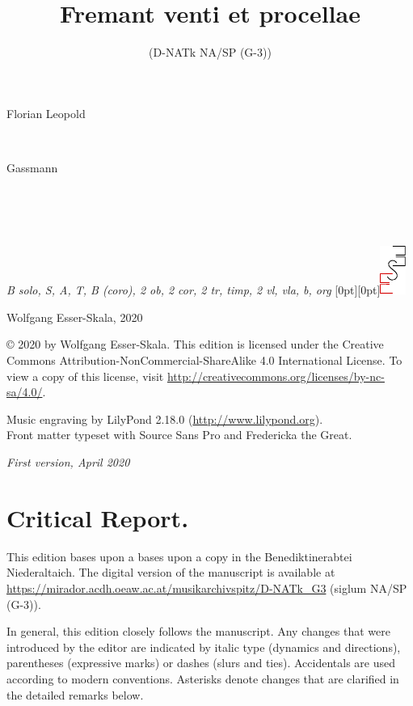 \documentclass[parskip=full]{scrreprt}
\makeatletter
\DeclareRobustCommand{\sbseries}{\fontseries{sb}\selectfont}
\newcommand\fancytitlehead{
	\headingfont%
	\fontsize{80}{80}\selectfont\textcolor{black!80}{\@lastname.}\\[15pt]%
	\fontsize{60}{60}\selectfont\@ifundefined{@shorttitle}{\@title}{\@shorttitle}.%
}
\def\firstname#1{\def\@firstname{#1}}
\def\lastname#1{\def\@lastname{#1}}
\def\shorttitle#1{\def\@shorttitle{#1}}
\def\instrumentation#1{\def\@instrumentation{#1}}
\def\maketitle{%
\begin{titlepage}%
	\Large%
	{\@titlehead}%
	\vfill%
	{\strut\@firstname}\\%
	{\sbseries\color{oldred}\strut\@lastname}\\%
	{\strut\@namesuffix}%
	\vfill%
	{\sbseries\@title}\\%
	{\@subtitle}\\[\baselineskip]%
	{\itshape\@instrumentation}%
	\vfill%
	{\itshape\@parts}\hspace*{\fill}\raisebox{0pt}[0pt][0pt]{\includegraphics{ees_logo}}%
\end{titlepage}%
}
\newif\ifprintreport\printreportfalse
\makeatother
\begin{document}
\titlehead{\fancytitlehead}
\firstname{Florian Leopold}
\lastname{Gassmann}
\title{Fremant venti et procellae}
\shorttitle{Fremant venti}
\subtitle{(D-NATk NA/SP (G-3))}
\instrumentation{B solo, S, A, T, B (coro), 2 ob, 2 cor, 2 tr, timp, 2 vl, vla, b, org}
\maketitle


\thispagestyle{empty}

\vspace*{\fill}

\hspace*{1em}Wolfgang Esser-Skala, 2020

© 2020 by Wolfgang Esser-Skala. This edition is licensed under the Creative Commons Attribution-NonCommercial-ShareAlike 4.0 International License. To view a copy of this license, visit \url{http://creativecommons.org/licenses/by-nc-sa/4.0/}. 

Music engraving by LilyPond 2.18.0 (\url{http://www.lilypond.org}).\\
Front matter typeset with Source Sans Pro and Fredericka the Great.

\textit{First version, April 2020}

\vspace*{2cm}

\ifprintreport
\chapter*{Critical Report.}

This edition bases upon a bases upon a copy in the Benediktinerabtei Niederaltaich. The digital version of the manuscript is available at \url{https://mirador.acdh.oeaw.ac.at/musikarchivspitz/D-NATk_G3} (siglum NA/SP (G-3)).

In general, this edition closely follows the manuscript. Any changes that were introduced by the editor are indicated by italic type (dynamics and directions), parentheses (expressive marks) or dashes (slurs and ties). Accidentals are used according to modern conventions. Asterisks denote changes that are clarified in the detailed remarks below.
\end{document}
